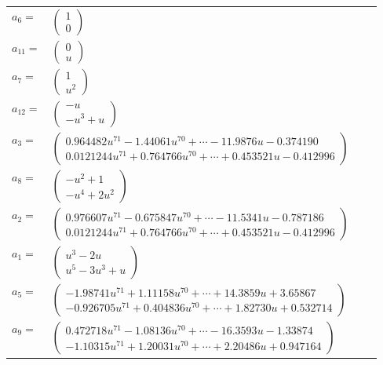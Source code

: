 \documentclass[1p]{elsarticle_modified}
\theoremstyle{definition}
\begin{document}
\begin{tabular}{m{7pt} m{180pt} m{7pt} m{180pt} }
\flushright $a_{6}=$&$\begin{pmatrix}1\\0\end{pmatrix}$ \\
\flushright $a_{11}=$&$\begin{pmatrix}0\\u\end{pmatrix}$ \\
\flushright $a_{7}=$&$\begin{pmatrix}1\\u^2\end{pmatrix}$ \\
\flushright $a_{12}=$&$\begin{pmatrix}- u\\- u^3+u\end{pmatrix}$ \\
\flushright $a_{3}=$&$\begin{pmatrix}0.964482 u^{71}-1.44061 u^{70}+\cdots-11.9876 u-0.374190\\0.0121244 u^{71}+0.764766 u^{70}+\cdots+0.453521 u-0.412996\end{pmatrix}$ \\
\flushright $a_{8}=$&$\begin{pmatrix}- u^2+1\\- u^4+2 u^2\end{pmatrix}$ \\
\flushright $a_{2}=$&$\begin{pmatrix}0.976607 u^{71}-0.675847 u^{70}+\cdots-11.5341 u-0.787186\\0.0121244 u^{71}+0.764766 u^{70}+\cdots+0.453521 u-0.412996\end{pmatrix}$ \\
\flushright $a_{1}=$&$\begin{pmatrix}u^3-2 u\\u^5-3 u^3+u\end{pmatrix}$ \\
\flushright $a_{5}=$&$\begin{pmatrix}-1.98741 u^{71}+1.11158 u^{70}+\cdots+14.3859 u+3.65867\\-0.926705 u^{71}+0.404836 u^{70}+\cdots+1.82730 u+0.532714\end{pmatrix}$ \\
\flushright $a_{9}=$&$\begin{pmatrix}0.472718 u^{71}-1.08136 u^{70}+\cdots-16.3593 u-1.33874\\-1.10315 u^{71}+1.20031 u^{70}+\cdots+2.20486 u+0.947164\end{pmatrix}$ \\

\end{tabular}
\end{document}
